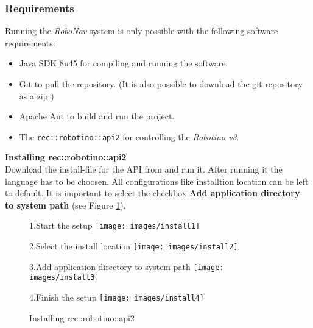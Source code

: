 
\subsubsection{Requirements}
Running the \textit{RoboNav} system is only possible with the following software requirements:
\begin{itemize}
	\item Java SDK 8u45 for compiling and running the software. \cite{gitdown}
	\item Git to pull the repository. (It is also possible to download the git-repository as a zip \cite{robonavgit})
	\item Apache Ant to build and run the project. \cite{antdown}
	\item The \texttt{rec::robotino::api2} for controlling the \textit{Robotino v3}. \cite{api2down}
\end{itemize}

\textbf{Installing rec::robotino::api2}\\
Download the install-file for the API from \cite{api2down} and run it. After running it the language has to be choosen. All configurations like installtion location can be left to default. It is important to select the checkbox \textbf{Add application directory to system path} (see Figure \ref{fig:install}).

\begin{figure}[htb!]
	\begin{minipage}{.5\textwidth}
		1.Start the setup
		\centering\texttt{[image: images/install1]}
	\end{minipage}
	\begin{minipage}{.5\textwidth}
		2.Select the install location
		\centering\texttt{[image: images/install2]}
	\end{minipage}
	\begin{minipage}{.5\textwidth}
		3.Add application directory to system path
		\centering\texttt{[image: images/install3]}
	\end{minipage}
	\begin{minipage}{.5\textwidth}
		4.Finish the setup
		\centering\texttt{[image: images/install4]}
	\end{minipage}
	\caption[Installing rec::robotino::api2 (self-made)]{Installing rec::robotino::api2}
	\label{fig:install}
\end{figure}
\FloatBarrier

